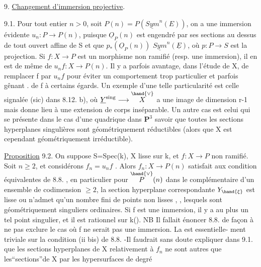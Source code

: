 
9. \uline{Changement d'immersion projective}.

9.1. Pour tout entier $n > 0$, soit $P(n) = P(\underline{Sym}^n(E))$, on a une
immersion évidente $u_n\colon P \to P(n)$, puisque $\underline{O}_P(n)$ est engendré par
ses sections au dessus de tout ouvert affine de S et que $p_*(\underline{O}_P(n))$
$\underline{Sym}^n(\underline{E})$, où $p\colon P \to S$ est la projection. Si $f\colon X\to P$ est un morphisme
non ramifié (resp. une immersion), il en est de même de $u_n f\colon X \to P(n)$.
Il y a parfois avantage, dans l'étude de X, de  remplacer f par $u_n f$ 
pour éviter un comportement trop particulier et parfois  gênant .
de f à certains égards. Un exemple d'une telle particularité est celle
 signalée (sic) dans 8.12. b),  où $\underline{Y}^{\mathrm{sing}} \longrightarrow \overset{\hand{\vee}}{X}$ a une image de
dimension r-1 mais  donne lieu à une extension
de corps inséparable. Un autre cas est celui qui se présente dans le cas
d'une quadrique dans $\mathbf{P}^3$ savoir que
toutes les sections hyperplanes singulières sont géométriquement
réductibles (alors que X est cependant géométriquement irréductible).

\uline{Proposition} 9.2. On suppose S=Spec(k), X lisse sur k, et $f\colon X\to P$ non
ramifié. Soit $n \geq 2$, et considérons $f_n = u_n f$ . Alors $f_n : X \to P(n)$
satisfait aux condition équivalentes de 8.8. , en particulier
pour \hand{$\xi \in$} $\overset{\hand{\vee}}{P}(n)$ dans le complémentaire d'un ensemble de codimension $\geq 2$,
la section hyperplane correspondante $Y_{\hand{\xi}}$ est lisse  ou n'admet qu'un
nombre fini de points non lisses ,
, lesquels sont géométriquement singuliers
ordinaires. Si f est une immersion, il y a au
plus un tel point singulier, et il est rationnel sur k(\hand{$\xi$}).
\placedmargin{$\|$} NB Il fallait énoncer 8.8. de façon à  ne pas exclure le
cas où f ne serait pas une immersion. La  est essentielle-%
ment triviale sur la condition (ii bis) de 8.8. -Il faudrait sans doute
expliquer dans 9.1. que les sections hyperplanes de X relativement à
 $f_n$ ne sont autres que les``sections''de X par les hypersurfaces de degré
